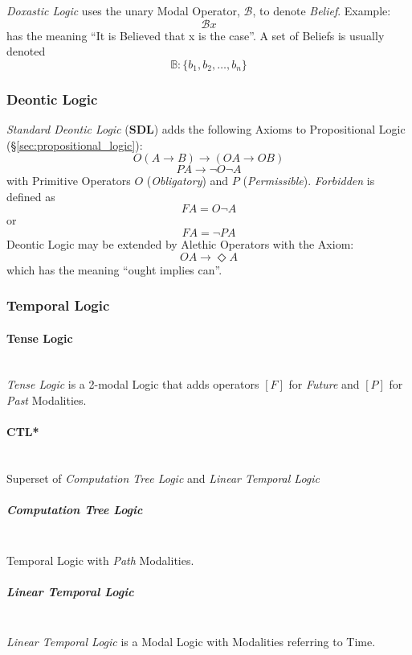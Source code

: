 \emph{Doxastic Logic} uses the unary Modal Operator, $\mathcal{B}$, to
denote \emph{Belief}. Example:
\[
    \mathcal{B} x
\]
has the meaning ``It is Believed that x is the case''. A set of
Beliefs is usually denoted
\[
    \mathbb{B}: \{ b_1, b_2, \ldots, b_n \}
\]



\subsubsection{Deontic Logic}\label{sec:deontic_logic}

\emph{Standard Deontic Logic} ($\mathbf{SDL}$) adds the following
Axioms to Propositional Logic (\S\ref{sec:propositional_logic}):
    \[O(A \rightarrow B) \rightarrow (OA \rightarrow OB)\]
    \[PA \rightarrow \neg O \neg A\]
with Primitive Operators $O$ (\emph{Obligatory}) and $P$
(\emph{Permissible}). \emph{Forbidden} is defined as
    \[FA = O \neg A\]
or
    \[FA = \neg P A\]
Deontic Logic may be extended by Alethic Operators with the Axiom:
    \[OA \rightarrow \Diamond A\]
which has the meaning ``ought implies can''.



\subsubsection{Temporal Logic}

\paragraph{Tense Logic} \hfill \\

\emph{Tense Logic} is a 2-modal Logic that adds operators $[F]$ for
\emph{Future} and $[P]$ for \emph{Past} Modalities.



\paragraph{CTL*}
\hfill \\
Superset of \emph{Computation Tree Logic} and \emph{Linear
  Temporal Logic}

\subparagraph{Computation Tree Logic}
\hfill \\
Temporal Logic with \emph{Path} Modalities.

\subparagraph{Linear Temporal Logic}\label{sec:linear_temporal}
\hfill \\
\emph{Linear Temporal Logic} is a Modal Logic with Modalities
referring to Time.



